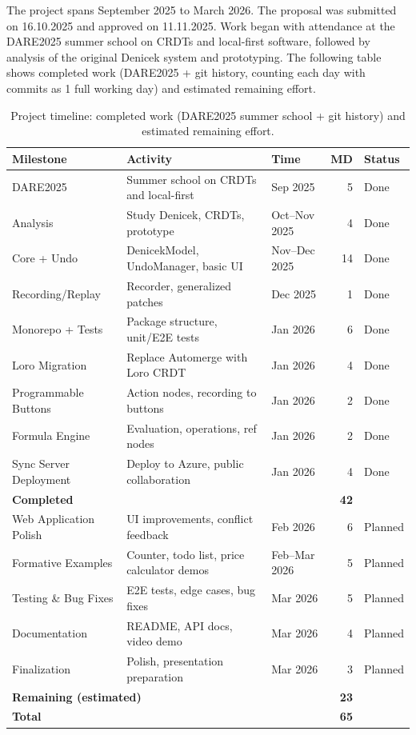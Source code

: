 \documentclass{article}
\begin{document}
The project spans September 2025 to March 2026. The proposal was submitted on 16.10.2025 and approved on 11.11.2025. Work began with attendance at the DARE2025 summer school on CRDTs and local-first software, followed by analysis of the original Denicek system and prototyping. The following table shows completed work (DARE2025 + git history, counting each day with commits as 1 full working day) and estimated remaining effort.

\begin{table}[h]
\centering
\begin{tabular}{|l|l|l|r|l|}
\hline
\textbf{Milestone} & \textbf{Activity} & \textbf{Time} & \textbf{MD} & \textbf{Status} \\
\hline
DARE2025 & Summer school on CRDTs and local-first & Sep 2025 & 5 & Done \\
\hline
Analysis & Study Denicek, CRDTs, prototype & Oct--Nov 2025 & 4 & Done \\
\hline
Core + Undo & DenicekModel, UndoManager, basic UI & Nov--Dec 2025 & 14 & Done \\
\hline
Recording/Replay & Recorder, generalized patches & Dec 2025 & 1 & Done \\
\hline
Monorepo + Tests & Package structure, unit/E2E tests & Jan 2026 & 6 & Done \\
\hline
Loro Migration & Replace Automerge with Loro CRDT & Jan 2026 & 4 & Done \\
\hline
Programmable Buttons & Action nodes, recording to buttons & Jan 2026 & 2 & Done \\
\hline
Formula Engine & Evaluation, operations, ref nodes & Jan 2026 & 2 & Done \\
\hline
Sync Server Deployment & Deploy to Azure, public collaboration & Jan 2026 & 4 & Done \\
\hline
\hline
\multicolumn{3}{|l|}{\textbf{Completed}} & \textbf{42} & \\
\hline
\hline
Web Application Polish & UI improvements, conflict feedback & Feb 2026 & 6 & Planned \\
\hline
Formative Examples & Counter, todo list, price calculator demos & Feb--Mar 2026 & 5 & Planned \\
\hline
Testing \& Bug Fixes & E2E tests, edge cases, bug fixes & Mar 2026 & 5 & Planned \\
\hline
Documentation & README, API docs, video demo & Mar 2026 & 4 & Planned \\
\hline
Finalization & Polish, presentation preparation & Mar 2026 & 3 & Planned \\
\hline
\hline
\multicolumn{3}{|l|}{\textbf{Remaining (estimated)}} & \textbf{23} & \\
\hline
\hline
\multicolumn{3}{|l|}{\textbf{Total}} & \textbf{65} & \\
\hline
\end{tabular}
\caption{Project timeline: completed work (DARE2025 summer school + git history) and estimated remaining effort.}
\end{table}
\end{document}
